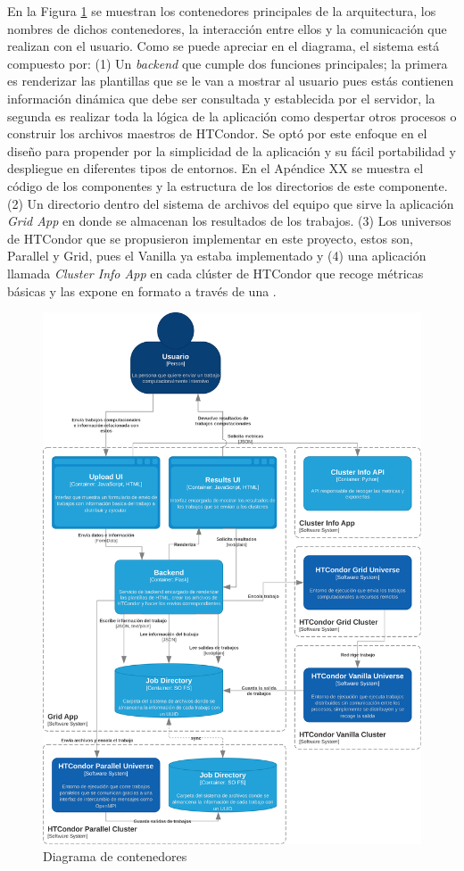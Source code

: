 En la Figura \ref{fig:C4Nivel2} se muestran los contenedores principales de la arquitectura, los nombres de dichos contenedores, la interacción entre ellos y la comunicación que realizan con el usuario. Como se puede apreciar en el diagrama, el sistema está compuesto por: (1) Un \textit{backend} que cumple dos funciones principales; la primera es renderizar las plantillas que se le van a mostrar al usuario pues estás contienen información dinámica que debe ser consultada y establecida por el servidor, la segunda es realizar toda la lógica de la aplicación como despertar otros procesos o construir los archivos maestros de HTCondor. Se optó por este enfoque en el diseño para propender por la simplicidad de la aplicación y su fácil portabilidad y despliegue en diferentes tipos de entornos. En el Apéndice XX se muestra el código de los componentes y la estructura de los directorios de este componente. (2) Un directorio dentro del sistema de archivos del equipo que sirve la aplicación \textit{Grid App} en donde se almacenan los resultados de los trabajos. (3) Los universos de HTCondor que se propusieron implementar en este proyecto, estos son, Parallel y Grid, pues el Vanilla ya estaba implementado y (4) una aplicación llamada \textit{Cluster Info App} en cada clúster de HTCondor que recoge métricas básicas y las expone en formato \JSON a través de una \API.

\begin{figure}[H]
	\centering
	\includegraphics[scale=0.1]{tablas-images/C4/Diagramas HTCondor-Nivel 2.drawio.png}
	\caption{Diagrama de contenedores}
    \label{fig:C4Nivel2}
\end{figure}

